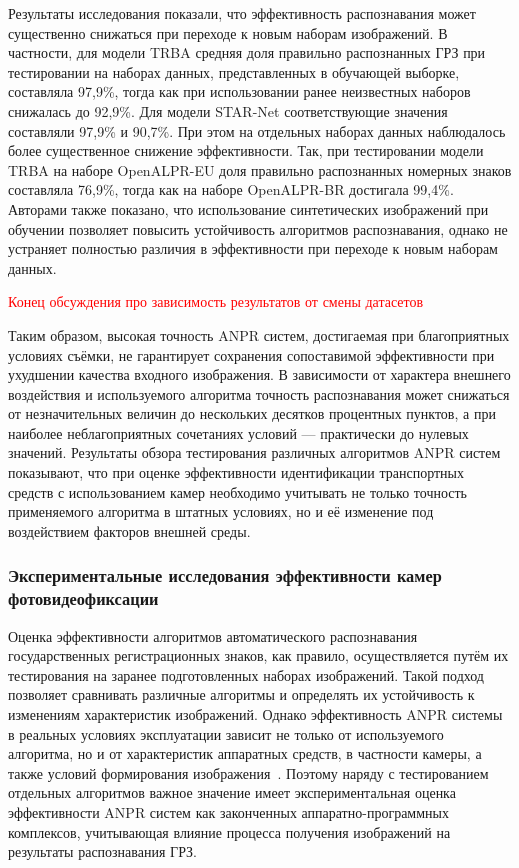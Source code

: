 \documentclass[12pt]{article}
\theoremstyle{definition}
\begin{document}
Результаты исследования показали, что эффективность распознавания может существенно снижаться при переходе к новым наборам изображений. В частности, для модели TRBA средняя доля правильно распознанных ГРЗ при тестировании на наборах данных, представленных в обучающей выборке, составляла 97,9\%, тогда как при использовании ранее неизвестных наборов снижалась до 92,9\%. Для модели STAR-Net соответствующие значения составляли 97,9\% и 90,7\%. При этом на отдельных наборах данных наблюдалось более существенное снижение эффективности. Так, при тестировании модели TRBA на наборе OpenALPR-EU доля правильно распознанных номерных знаков составляла 76,9\%, тогда как на наборе OpenALPR-BR достигала 99,4\%. Авторами также показано, что использование синтетических изображений при обучении позволяет повысить устойчивость алгоритмов распознавания, однако не устраняет полностью различия в эффективности при переходе к новым наборам данных.

\textcolor{red}{Конец обсуждения про зависимость результатов от смены датасетов}

Таким образом, высокая точность ANPR систем, достигаемая при благоприятных условиях съёмки, не гарантирует сохранения сопоставимой эффективности при ухудшении качества входного изображения. В зависимости от характера внешнего воздействия и используемого алгоритма точность распознавания может снижаться от незначительных величин до нескольких десятков процентных пунктов, а при наиболее неблагоприятных сочетаниях условий — практически до нулевых значений. Результаты обзора тестирования различных алгоритмов ANPR систем показывают, что при оценке эффективности идентификации транспортных средств с использованием камер необходимо учитывать не только точность применяемого алгоритма в штатных условиях, но и её изменение под воздействием факторов внешней среды.



\subsubsection{Экспериментальные исследования эффективности камер фотовидеофиксации}

Оценка эффективности алгоритмов автоматического распознавания государственных регистрационных знаков, как правило, осуществляется путём их тестирования на заранее подготовленных наборах изображений. Такой подход позволяет сравнивать различные алгоритмы и определять их устойчивость к изменениям характеристик изображений. Однако эффективность ANPR системы в реальных условиях эксплуатации зависит не только от используемого алгоритма, но и от характеристик аппаратных средств, в частности камеры, а также условий формирования изображения~\cite{Leszczuk2023}. Поэтому наряду с тестированием отдельных алгоритмов важное значение имеет экспериментальная оценка эффективности ANPR систем как законченных аппаратно-программных комплексов, учитывающая влияние процесса получения изображений на результаты распознавания ГРЗ.
\end{document}
